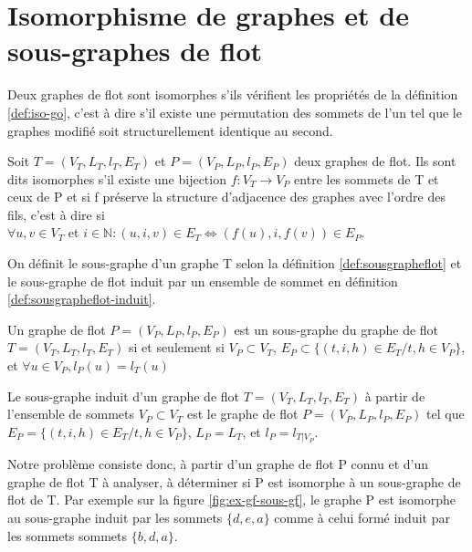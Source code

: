\section{Isomorphisme de graphes et de sous-graphes de flot}


Deux graphes de flot sont isomorphes s'ils vérifient les
propriétés de la définition \ref{def:iso-go}, c'est à dire s'il existe une permutation des sommets de l'un tel que le graphes modifié soit structurellement identique au second.

\begin{defi}\label{def:iso-go}
Soit $T=(V_T, L_T, l_T, E_T)$ et $P=(V_P, L_P, l_P, E_P)$ deux graphes de flot. Ils sont dits isomorphes s'il existe une bijection $f:V_T\rightarrow V_P$ entre les sommets de T et ceux de P et
si f préserve la structure d'adjacence des graphes avec l'ordre des fils, c'est à dire si \\
$\forall u, v \in V_T$ et $i\in\mathbb{N} : (u, i, v) \in E_T \Leftrightarrow (f(u), i, f(v)) \in E_P$.
\end{defi}

On définit le sous-graphe d'un graphe T selon la définition \ref{def:sousgrapheflot} et le sous-graphe de flot induit par un ensemble de sommet en définition \ref{def:sousgrapheflot-induit}.

\begin{defi}\label{def:sousgrapheflot}
Un graphe de flot $P=(V_P, L_P, l_P, E_P)$ est un sous-graphe du graphe de flot $T=(V_T, L_T, l_T, E_T)$ si et seulement si $V_P \subset V_T$, $E_P\subset\{(t, i, h)\in E_T / t, h \in V_P \}$, et $\forall u\in V_P, l_P(u)=l_T(u)$
\end{defi}

\begin{defi}\label{def:sousgrapheflot-induit}
Le sous-graphe induit d'un graphe de flot $T=(V_T, L_T, l_T, E_T)$ à partir de l'ensemble de sommets $V_P \subset V_T$ est le graphe de flot $P=(V_P, L_P, l_P, E_P)$ tel que $E_P=\{(t, i, h)\in E_T / t, h \in V_P \}$, $L_P=L_T$, et $l_P=l_{T\vert V_P}$.
\end{defi}

Notre problème consiste donc, à partir d'un graphe de flot P connu et d'un graphe de flot T à analyser, à déterminer si P est isomorphe à un sous-graphe de flot de T.
Par exemple sur la figure \ref{fig:ex-gf-sous-gf}, le graphe P est isomorphe au sous-graphe induit par les sommets $\{d, e, a\}$ comme à celui formé induit par les sommets sommets $\{b, d, a\}$.



